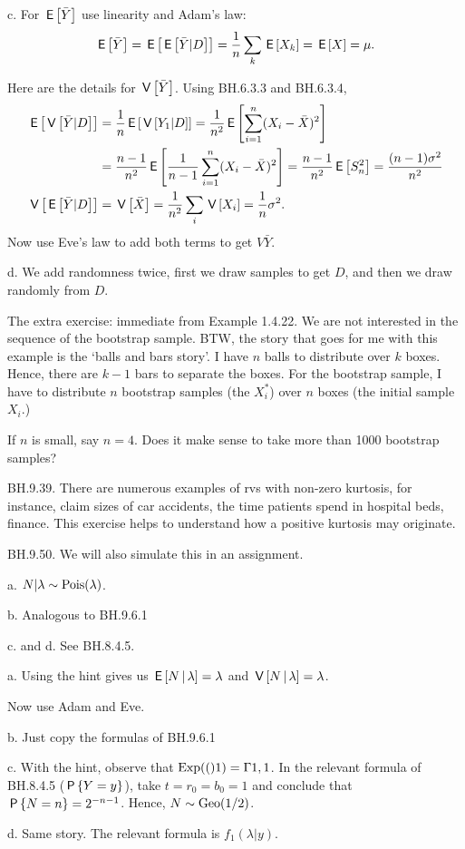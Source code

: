 \begin{exercise}
\begin{solution}
c. For $\E{\bar Y}$ use linearity and Adam's law:
\begin{align*}
\E{\bar Y} = \E{\E{\bar Y|D}} = \frac 1 n \sum_{k}\E{X_{k}} = \E X = \mu.
\end{align*}


Here are the details for $\V{\bar Y}$. Using  BH.6.3.3 and BH.6.3.4,
\begin{align*}
\E{\V{\bar Y|D}} &=  \frac 1 n \E{\V{Y_{1}|D}} =
\frac 1 {n^2} \E{ \sum_{i=1}^n (X_i-\bar X)^2} \\
&= \frac{n-1} {n^2} \E{\frac 1 {n-1} \sum_{i=1}^n (X_i-\bar X)^2}
= \frac{n-1} {n^2} \E{S_{n}^2} = \frac{(n-1)\sigma^{2}} {n^2} \\
\V{\E{\bar Y|D}} &= \V{\bar X}= \frac 1{n^{2}} \sum_{i} \V{X_{i}} = \frac 1 n \sigma^{2}.
\end{align*}
Now use Eve's law to add both terms to get $V{\bar Y}$.


d. We add randomness twice, first we draw  samples to get $D$, and then we draw randomly from $D$.

The extra exercise: immediate from Example 1.4.22. We are not interested in the sequence of the bootstrap sample. BTW, the story that goes for me with this example is the `balls and bars story'. I have $n$ balls to distribute over $k$ boxes. Hence, there are $k-1$ bars to separate the boxes. For the bootstrap sample, I have to distribute $n$ bootstrap samples (the $X^*_{i}$) over $n$ boxes (the initial sample $X_i$.)

If $n$ is small, say $n=4$. Does it make sense to take more than 1000 bootstrap samples?
\end{solution}
\end{exercise}

\begin{exercise}
BH.9.39. There are numerous examples of rvs with  non-zero kurtosis, for instance,  claim sizes of car accidents, the time patients spend in hospital beds, finance. This exercise helps to understand how a positive kurtosis may originate.
\end{exercise}

\begin{exercise} BH.9.50.  We will also simulate this in an assignment.
\begin{hint}
a.
$N | \lambda \sim \Pois{\lambda}$.

b. Analogous to BH.9.6.1

c. and d. See BH.8.4.5.
\end{hint}
\begin{solution}
a. Using the hint gives us $\E{N\given \lambda} = \lambda$ and $\V{N\given \lambda}= \lambda$.

Now use Adam and Eve.

b. Just copy the formulas of BH.9.6.1

c. With the hint, observe that $\Exp(1)=\Gamma{1,1}$. In the relevant formula of BH.8.4.5 ($\P{Y=y}$), take $t=r_0=b_0=1$ and conclude that $\P{N=n}=2^{-n-1}$. Hence, $N\sim\Geo{1/2}$.

d. Same story. The relevant formula is $f_1(\lambda|y)$.
\end{solution}
\end{exercise}

